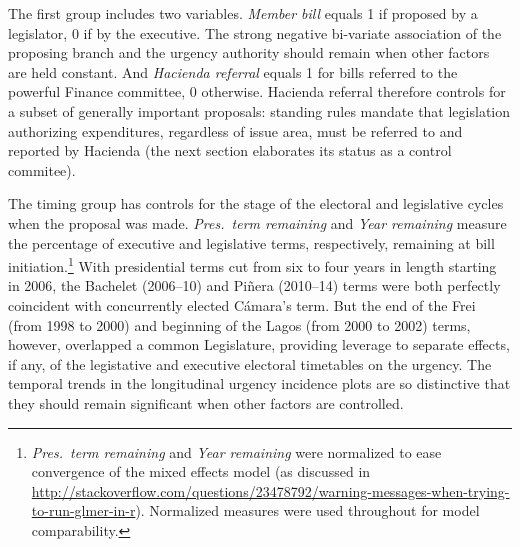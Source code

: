 \documentclass[letter,12pt]{article}
\begin{document}
The first group includes two variables. \emph{Member bill} equals 1 if proposed by a legislator, 0 if by the executive. The strong negative bi-variate association of the proposing branch and the urgency authority should remain when other factors are held constant. And \emph{Hacienda referral} equals 1 for bills referred to the powerful Finance committee, 0 otherwise. Hacienda referral therefore controls for a subset of generally important proposals: standing rules mandate that legislation authorizing expenditures, regardless of issue area, must be referred to and reported by Hacienda (the next section elaborates its status as a control commitee). 

The timing group has controls for the stage of the electoral and legislative cycles when the proposal was made. \emph{Pres.~term remaining} and \emph{Year remaining} measure the percentage of executive and legislative terms, respectively, remaining at bill initiation.\footnote{\emph{Pres.~term remaining} and \emph{Year remaining} were normalized to ease convergence of the mixed effects model (as discussed in \url{http://stackoverflow.com/questions/23478792/warning-messages-when-trying-to-run-glmer-in-r}). Normalized measures were used throughout for model comparability.} With presidential terms cut from six to four years in length starting in 2006, the Bachelet (2006--10) and Pi\~nera (2010--14) terms were both perfectly coincident with concurrently elected C\'amara's term. But the end of the Frei (from 1998 to 2000) and beginning of the Lagos (from 2000 to 2002) terms, however, overlapped a common Legislature, providing leverage to separate effects, if any, of the legistative and executive electoral timetables on the urgency. The temporal trends in the longitudinal urgency incidence plots are so distinctive that they should remain significant when other factors are controlled. 
\end{document}
